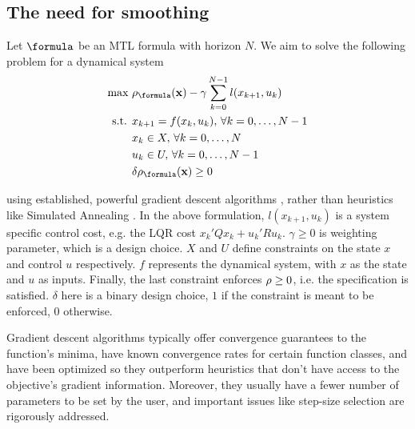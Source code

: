 \subsection{The need for smoothing}
\label{sec:need for smoothing}
Let $\formula$ be an MTL formula with horizon $N$.
We aim to solve the following problem for a dynamical system
\begin{subequations}
\label{eq:general_ctrl}
\begin{align}
\text{max } & \rob_{\formula}(\sstraj) - \gamma \sum_{k=0}^{N-1} l(x_{k+1},u_{k}) \\
\text{s.t. } & x_{k+1} = f(x_k,u_k), \, \forall k=0,\dotsc,N-1 \\
 & x_k \in X, \, \forall k=0,\dotsc,N \\
 & u_k \in U, \, \forall k=0,\dotsc,N-1 \\
 & \delta \rob_{\formula}(\sstraj) \geq 0
\end{align}
\end{subequations}

using established, powerful gradient descent algorithms \cite{Polak97_Optim}, rather than heuristics like Simulated Annealing \cite{kirkpatrickV_SA83}. In the above formulation, $l(x_{k+1},u_{k})$ is a system specific control cost, e.g. the LQR cost $x_k'Qx_k + u_k'Ru_k$. $\gamma \geq 0$ is weighting parameter, which is a design choice. $X$ and $U$ define constraints on the state $x$ and control $u$ respectively. $f$ represents the dynamical system, with $x$ as the state and $u$ as inputs. Finally, the last constraint enforces $\rho \geq 0$, i.e. the specification is satisfied. $\delta$ here is a binary design choice, $1$ if the constraint is meant to be enforced, $0$ otherwise.

Gradient descent algorithms typically offer convergence guarantees to the function's minima, have known convergence rates for certain function classes, and have been optimized so they outperform heuristics that don't have access to the objective's gradient information.
Moreover, they usually have a fewer number of parameters to be set by the user, and important issues like step-size selection are rigorously addressed.

